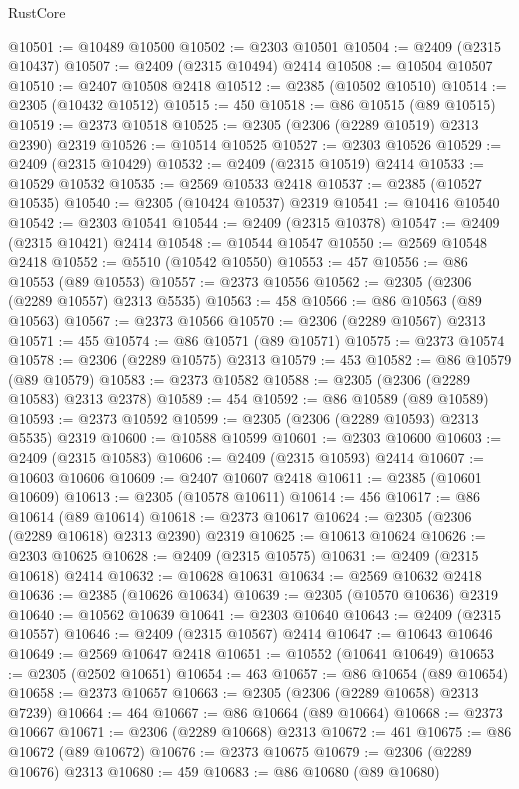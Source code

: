 \begin{lexlean}{RustCore}
\begin{coremodule}
@10501 := @10489 @10500
@10502 := @2303 @10501
@10504 := @2409 (@2315 @10437)
@10507 := @2409 (@2315 @10494) @2414
@10508 := @10504 @10507
@10510 := @2407 @10508 @2418
@10512 := @2385 (@10502 @10510)
@10514 := @2305 (@10432 @10512)
@10515 := 450
@10518 := @86 @10515 (@89 @10515)
@10519 := @2373 @10518
@10525 := @2305 (@2306 (@2289 @10519) @2313 @2390) @2319
@10526 := @10514 @10525
@10527 := @2303 @10526
@10529 := @2409 (@2315 @10429)
@10532 := @2409 (@2315 @10519) @2414
@10533 := @10529 @10532
@10535 := @2569 @10533 @2418
@10537 := @2385 (@10527 @10535)
@10540 := @2305 (@10424 @10537) @2319
@10541 := @10416 @10540
@10542 := @2303 @10541
@10544 := @2409 (@2315 @10378)
@10547 := @2409 (@2315 @10421) @2414
@10548 := @10544 @10547
@10550 := @2569 @10548 @2418
@10552 := @5510 (@10542 @10550)
@10553 := 457
@10556 := @86 @10553 (@89 @10553)
@10557 := @2373 @10556
@10562 := @2305 (@2306 (@2289 @10557) @2313 @5535)
@10563 := 458
@10566 := @86 @10563 (@89 @10563)
@10567 := @2373 @10566
@10570 := @2306 (@2289 @10567) @2313
@10571 := 455
@10574 := @86 @10571 (@89 @10571)
@10575 := @2373 @10574
@10578 := @2306 (@2289 @10575) @2313
@10579 := 453
@10582 := @86 @10579 (@89 @10579)
@10583 := @2373 @10582
@10588 := @2305 (@2306 (@2289 @10583) @2313 @2378)
@10589 := 454
@10592 := @86 @10589 (@89 @10589)
@10593 := @2373 @10592
@10599 := @2305 (@2306 (@2289 @10593) @2313 @5535) @2319
@10600 := @10588 @10599
@10601 := @2303 @10600
@10603 := @2409 (@2315 @10583)
@10606 := @2409 (@2315 @10593) @2414
@10607 := @10603 @10606
@10609 := @2407 @10607 @2418
@10611 := @2385 (@10601 @10609)
@10613 := @2305 (@10578 @10611)
@10614 := 456
@10617 := @86 @10614 (@89 @10614)
@10618 := @2373 @10617
@10624 := @2305 (@2306 (@2289 @10618) @2313 @2390) @2319
@10625 := @10613 @10624
@10626 := @2303 @10625
@10628 := @2409 (@2315 @10575)
@10631 := @2409 (@2315 @10618) @2414
@10632 := @10628 @10631
@10634 := @2569 @10632 @2418
@10636 := @2385 (@10626 @10634)
@10639 := @2305 (@10570 @10636) @2319
@10640 := @10562 @10639
@10641 := @2303 @10640
@10643 := @2409 (@2315 @10557)
@10646 := @2409 (@2315 @10567) @2414
@10647 := @10643 @10646
@10649 := @2569 @10647 @2418
@10651 := @10552 (@10641 @10649)
@10653 := @2305 (@2502 @10651)
@10654 := 463
@10657 := @86 @10654 (@89 @10654)
@10658 := @2373 @10657
@10663 := @2305 (@2306 (@2289 @10658) @2313 @7239)
@10664 := 464
@10667 := @86 @10664 (@89 @10664)
@10668 := @2373 @10667
@10671 := @2306 (@2289 @10668) @2313
@10672 := 461
@10675 := @86 @10672 (@89 @10672)
@10676 := @2373 @10675
@10679 := @2306 (@2289 @10676) @2313
@10680 := 459
@10683 := @86 @10680 (@89 @10680)

\end{coremodule}
\end{lexlean}
